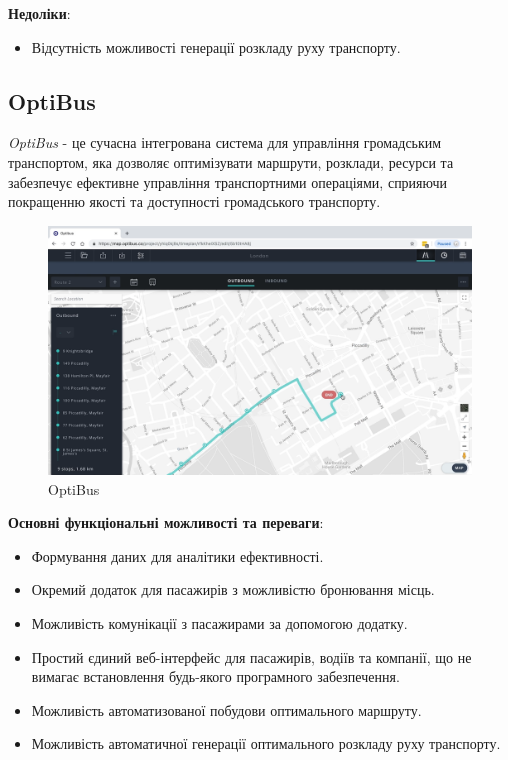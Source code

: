 \documentclass[14pt]{extreport}
\begin{document}
\begin{normalsize}
	\textbf{Недоліки}:
	\begin{itemize}
		\item Відсутність можливості генерації розкладу руху транспорту.
	\end{itemize}
	
	\subsection*{OptiBus}
	\textit{OptiBus} - це сучасна інтегрована система для управління громадським транспортом, яка дозволяє оптимізувати маршрути, розклади, ресурси та забезпечує ефективне управління транспортними операціями, сприяючи покращенню якості та доступності громадського транспорту.
	
	
	\begin{figure}[H]
		\centering
		\includegraphics[scale=0.25]{3}
		\caption{OptiBus}
	\end{figure}
	
	\textbf{Основні функціональні можливості та переваги}:
	\begin{itemize}
		\item Формування даних для аналітики ефективності.
		\item Окремий додаток для пасажирів з можливістю бронювання місць.
		\item Можливість комунікації з пасажирами за допомогою додатку.
		\item Простий єдиний веб-інтерфейс для пасажирів, водіїв та компанії, що не вимагає встановлення будь-якого програмного забезпечення.
		\item Можливість автоматизованої побудови оптимального маршруту.
		\item Можливість автоматичної генерації оптимального розкладу руху транспорту.
	\end{itemize}
	

\end{normalsize}
\end{document}
